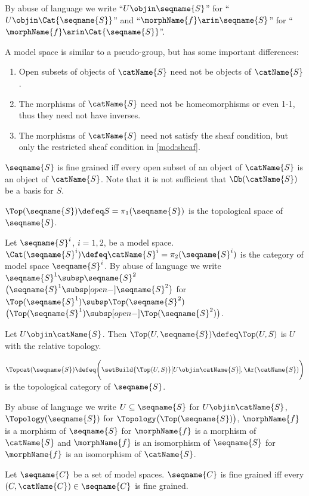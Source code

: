 \documentclass{article}
\begin{document}
\begin{definition}
By abuse of language we write
{\textquotedblleft}$U \objin \seqname{S}${\textquotedblright} for
{\textquotedblleft}$U \objin \Cat{\seqname{S}}${\textquotedblright} and
{\textquotedblleft}$\morphName{f} \arin \seqname{S}${\textquotedblright}
for
{\textquotedblleft}$\morphName{f} \arin \Cat{\seqname{S}}${\textquotedblright}.

\begin{remark}
A model space is similar to a pseudo-group, but has some important
differences:
\begin{enumerate}
\item
Open subsets of objects of $\catName{S}$ need not be objects of
$\catName{S}$.

\item
The morphisms of $\catName{S}$ need not be homeomorphisms or even 1-1,
thus they need not have inverses.

\item
The morphisms of $\catName{S}$ need not satisfy the sheaf condition,
but only the restricted sheaf condition in \cref{mod:sheaf}.
\end{enumerate}
\end{remark}

$\seqname{S}$ is fine grained iff every open subset of an object of
$\catName{S}$ is an object of $ \catName{S}$. Note that it is not
sufficient that $\Ob(\catName{S})$ be a basis for $S$.

$\Top(\seqname{S}) \defeq S = \pi_1(\seqname{S})$ is the topological
space of $\seqname{S}$.

Let $\seqname{S}^i$, $i=1,2$, be a model space.
$\Cat(\seqname{S}^i) \defeq \catName{S}^i = \pi_2(\seqname{S}^i)$ is the
category of model space $\seqname{S}^i$.
By abuse of language we write $\seqname{S}^1 \subsp \seqname{S}^2$
$\bigl ( \seqname{S}^1 \subsp[open-] \seqname{S}^2 \bigr )$ for
$\Top(\seqname{S}^1) \subsp \Top(\seqname{S}^2)$
$\bigl ( \Top(\seqname{S}^1) \subsp[open-] \Top(\seqname{S}^2) \bigr )$.

Let $U \objin \catName{S}$. Then $\Top(U,\seqname{S}) \defeq \Top(U,S)$
is $U$ with the relative topology.

$
  \Topcat(\seqname{S}) \defeq
  \Biggl (
    \setBuild
      {{\Top(U,S)}}%
      [{U \objin \catName{S}}],
    \Ar(\catName{S})
  \Biggr )
$
is the topological category of $\seqname{S}$.

By abuse of language we write $U \subseteq \seqname{S}$ for
$U \objin \catName{S}$, $\Topology(\seqname{S})$ for
$\Topology \bigl ( \Top(\seqname{S}) \bigr )$, $\morphName{f}$ is a
morphism of $\seqname{S}$ for $\morphName{f}$ is a morphism of
$\catName{S}$ and $\morphName{f}$ is an isomorphism of $\seqname{S}$ for
$\morphName{f}$ is an isomorphism of $\catName{S}$.

Let $\seqname{C}$ be a set of model spaces. $\seqname{C}$ is fine
grained iff every $(C,\catName{C}) \in \seqname{C}$ is fine grained.
\end{definition}
\end{document}
